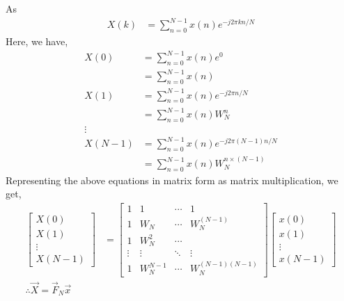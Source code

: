 \documentclass[journal,12pt,twocolumn]{IEEEtran}
\renewcommand\thesection{\arabic{section}}
\begin{document}
\begin{enumerate}[label=\arabic*.,ref=\thesection.\theenumi]
	As \begin{align} 
		X(k)&=\sum_{n=0}^{N-1} x(n) e^{-j 2 \pi k n /N}
	\end{align}
 Here, we have,
 \begin{align}
 X(0)&=	\sum_{n=0}^{N-1} x(n) e^{0}\\
 &=\sum_{n=0}^{N-1} x(n)\\
 X(1)&=	\sum_{n=0}^{N-1} x(n) e^{-j 2 \pi n /N}\\
 &=\sum_{n=0}^{N-1} x(n) W_N^{n} \\
 \vdots\\
 X(N-1)&=\sum_{n=0}^{N-1} x(n) e^{-j 2 \pi (N-1) n /N}\\
 &=\sum_{n=0}^{N-1} x(n) W_N^{n \times (N-1)} 
 \end{align}
Representing the above equations in matrix form as matrix multiplication, we get, 
	\begin{align}
		\begin{bmatrix}
			X(0)\\X(1)\\ \vdots\\ X(N-1)
		\end{bmatrix}
		&=\begin{bmatrix}
			1&1&\cdots&1\\1&W_N&\cdots&W_N^{(N-1)}\\1&W_N^2&\cdots\\\vdots&\vdots&\ddots&\vdots\\1&W_N^{N-1}&\cdots&W_N^{(N-1)(N-1)}
		\end{bmatrix}\begin{bmatrix}
			x(0)\\x(1)\\\vdots\\ x(N-1)
		\end{bmatrix}\\
		\therefore \vec{X} = \vec{F}_N \vec{x}
	\end{align}

\end{enumerate}
\end{document}
